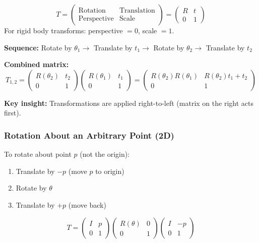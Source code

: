 \begin{thmbox}
\[
T = \begin{pmatrix} \text{Rotation} & \text{Translation} \\ \text{Perspective} & \text{Scale} \end{pmatrix} = \begin{pmatrix} R & t \\ 0 & 1 \end{pmatrix}
\]
For rigid body transforms: perspective $= 0$, scale $= 1$.
\end{thmbox}

\begin{exbox}
\textbf{Sequence:} Rotate by $\theta_1 \to$ Translate by $t_1 \to$ Rotate by $\theta_2 \to$ Translate by $t_2$

\textbf{Combined matrix:}
\[
T_{1,2} = \begin{pmatrix} R(\theta_2) & t_2 \\ 0 & 1 \end{pmatrix} \begin{pmatrix} R(\theta_1) & t_1 \\ 0 & 1 \end{pmatrix} = \begin{pmatrix} R(\theta_2)R(\theta_1) & R(\theta_2)t_1 + t_2 \\ 0 & 1 \end{pmatrix}
\]

\textbf{Key insight:} Transformations are applied right-to-left (matrix on the right acts first).
\end{exbox}

\separator

\subsubsection{Rotation About an Arbitrary Point (2D)}

\begin{thmbox}
To rotate about point $p$ (not the origin):
\begin{enumerate}
  \item Translate by $-p$ (move $p$ to origin)
  \item Rotate by $\theta$
  \item Translate by $+p$ (move back)
\end{enumerate}
\[
T = \begin{pmatrix} I & p \\ 0 & 1 \end{pmatrix} \begin{pmatrix} R(\theta) & 0 \\ 0 & 1 \end{pmatrix} \begin{pmatrix} I & -p \\ 0 & 1 \end{pmatrix}
\]
\end{thmbox}

